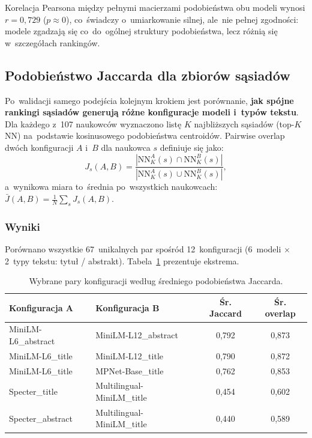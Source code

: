 Korelacja Pearsona między pełnymi macierzami podobieństwa
obu modeli wynosi $r = 0{,}729$ ($p \approx 0$),
co~świadczy o~umiarkowanie silnej, ale~nie pełnej zgodności:
modele zgadzają się co~do~ogólnej struktury podobieństwa,
lecz różnią się w~szczegółach rankingów.

\subsection{Podobieństwo Jaccarda dla zbiorów sąsiadów}
\label{subsec:jaccard}

Po~walidacji samego podejścia kolejnym krokiem jest porównanie,
\textbf{jak spójne rankingi sąsiadów generują różne konfiguracje
modeli i~typów tekstu}.
Dla każdego z~107 naukowców wyznaczono listę $K$ najbliższych sąsiadów
(top-$K$ NN) na~podstawie kosinusowego podobieństwa centroidów.
Pairwise overlap dwóch konfiguracji $A$ i~$B$ dla naukowca $s$
definiuje się jako:
\begin{equation}
    J_s(A, B) = \frac{|\mathrm{NN}_K^A(s) \cap \mathrm{NN}_K^B(s)|}
                     {|\mathrm{NN}_K^A(s) \cup \mathrm{NN}_K^B(s)|},
\end{equation}
a~wynikowa miara to~średnia po~wszystkich naukowcach:
$\bar{J}(A,B) = \frac{1}{N}\sum_s J_s(A,B)$.

\subsubsection{Wyniki}

Porównano wszystkie 67~unikalnych par spośród 12~konfiguracji
(6~modeli $\times$ 2~typy tekstu: tytuł / abstrakt).
Tabela~\ref{tab:jaccard_top} prezentuje ekstrema.

\begin{table}[H]
\centering
\caption{Wybrane pary konfiguracji według średniego podobieństwa Jaccarda.}
\label{tab:jaccard_top}
\begin{tabular}{llcc}
\toprule
\textbf{Konfiguracja A} & \textbf{Konfiguracja B} &
\textbf{Śr. Jaccard} & \textbf{Śr. overlap} \\
\midrule
MiniLM-L6\_abstract   & MiniLM-L12\_abstract    & 0{,}792 & 0{,}873 \\
MiniLM-L6\_title      & MiniLM-L12\_title       & 0{,}790 & 0{,}872 \\
MiniLM-L6\_title      & MPNet-Base\_title       & 0{,}762 & 0{,}853 \\
\midrule
Specter\_title        & Multilingual-MiniLM\_title  & 0{,}454 & 0{,}602 \\
Specter\_abstract     & Multilingual-MiniLM\_title  & 0{,}440 & 0{,}589 \\
\bottomrule
\end{tabular}
\end{table}


